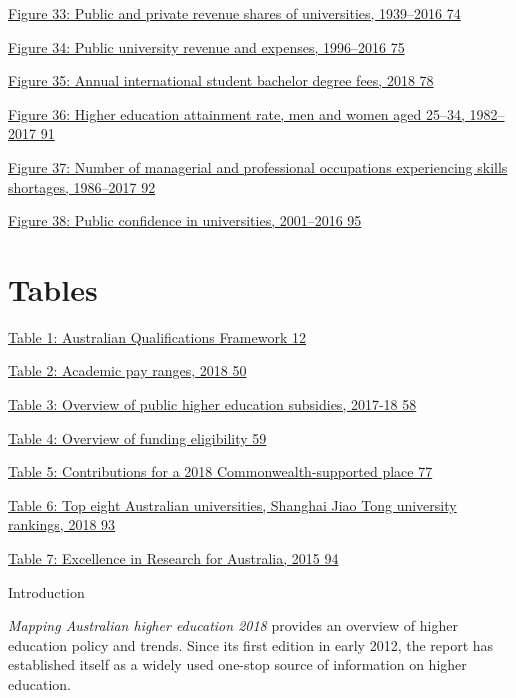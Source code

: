 \documentclass[]{book}
\begin{document}
\protect\hyperlink{_Ref398226881}{Figure 33: Public and private revenue shares of universities, 1939--2016 74}

\protect\hyperlink{_Ref457650501}{Figure 34: Public university revenue and expenses, 1996--2016 75}

\protect\hyperlink{_Ref395284723}{Figure 35: Annual international student bachelor degree fees, 2018 78}

\protect\hyperlink{_Ref400700286}{Figure 36: Higher education attainment rate, men and women aged 25--34, 1982--2017 91}

\protect\hyperlink{_Ref449096994}{Figure 37: Number of managerial and professional occupations experiencing skills shortages, 1986--2017 92}

\protect\hyperlink{_Ref343702103}{Figure 38: Public confidence in universities, 2001--2016 95}

\hypertarget{section-3}{%
\chapter{}\label{section-3}}

\hypertarget{tables}{%
\chapter{Tables}\label{tables}}

\protect\hyperlink{_Ref217526032}{Table 1: Australian Qualifications Framework 12}

\protect\hyperlink{_Ref395885416}{Table 2: Academic pay ranges, 2018 50}

\protect\hyperlink{_Ref313977905}{Table 3: Overview of public higher education subsidies, 2017-18 58}

\protect\hyperlink{_Ref311636093}{Table 4: Overview of funding eligibility 59}

\protect\hyperlink{_Ref311742121}{Table 5: Contributions for a 2018 Commonwealth-supported place 77}

\protect\hyperlink{_Ref315008720}{Table 6: Top eight Australian universities, Shanghai Jiao Tong university rankings, 2018 93}

\protect\hyperlink{_Ref343504338}{Table 7: Excellence in Research for Australia, 2015 94}

Introduction

\emph{Mapping Australian higher education 2018} provides an overview of higher education policy and trends. Since its first edition in early 2012, the report has established itself as a widely used one-stop source of information on higher education.
\end{document}
